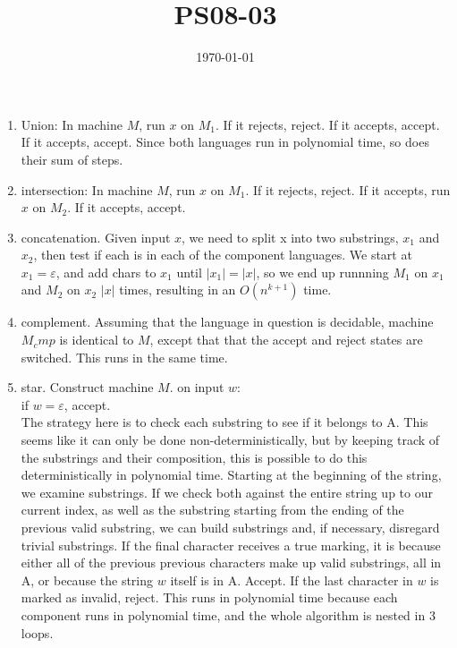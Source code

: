 \documentclass{article}
\title{PS08-03}
\date{\today}
\begin{document}
\maketitle
\begin{enumerate}[label=\alph*.]
	\item Union: In machine $M$, run $x$ on $M_1$. If it rejects, reject. If it accepts, accept. If it accepts, accept. Since both languages run in polynomial time, so does their sum of steps.
	\item intersection: In machine $M$, run $x$ on $M_1$. If it rejects, reject. If it accepts, run $x$ on $M_2$. If it accepts, accept. 
	\item concatenation.
	Given input $x$, we need to split x into two substrings, $x_1$ and $x_2$, then test if each is in each of the component languages. We start at $x_1 = \varepsilon$, and add chars to $x_1$ until $\lvert x_1 \rvert = \lvert x \rvert$, so we end up runnning $M_1$ on $x_1$ and $M_2$ on $x_2$ $\lvert x \rvert$ times, resulting in an $O(n^{k+1})$ time.
	\item complement.
	Assuming that the language in question is decidable, machine $M_cmp$ is identical to $M$, except that that the accept and reject states are switched. This runs in the same time. 
	\item star. Construct machine $M$.
	on input $w$:\\
	if $w = \varepsilon$, accept.\\
	The strategy here is to check each substring to see if it belongs to A. This seems like it can only be done non-deterministically,
	but by keeping track of the substrings and their composition, this is possible to do this deterministically in polynomial time.
	Starting at the beginning of the string, we examine substrings. If we check both against the entire string up to  our current
	index, as well as the substring starting from the ending of the previous valid substring, we can build substrings and, if
	necessary, disregard trivial substrings. If the final character receives a 
	true marking, it is because either all of the previous previous characters make up valid substrings, all in A, or because the string
	$w$ itself is in A. Accept. If the last character in $w$ is marked as invalid, reject. This runs in polynomial time
	because each component runs in polynomial time, and the whole algorithm is nested in 3 loops.
\end{enumerate}
\end{document}

